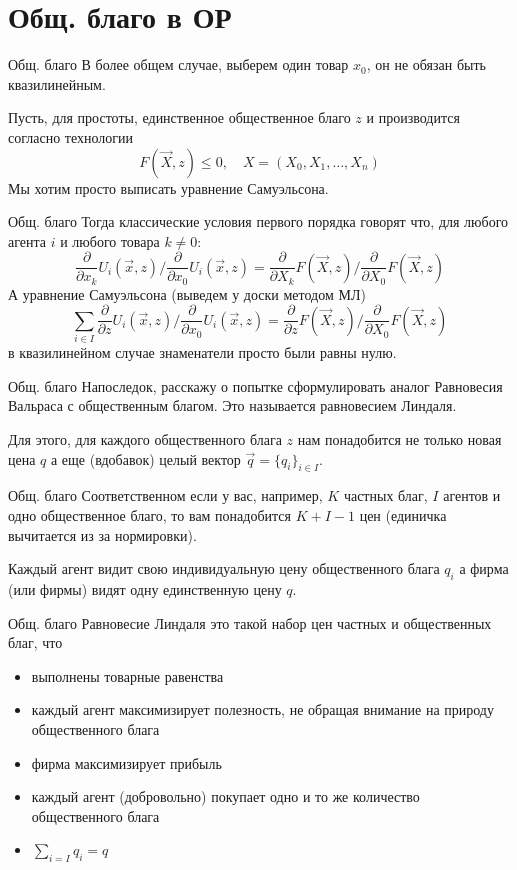 \documentclass{beamer}
\begin{document}
\section{Общ. благо в ОР}

\begin{frame}{Общ. благо}
В более общем случае, выберем один товар $x_0$, он не обязан быть квазилинейным. 

Пусть, для простоты, единственное общественное благо $z$ и производится согласно технологии
$$ F(\vec X, z) \leqslant 0, \quad X = (X_0,X_1, \ldots, X_n)$$
Мы хотим просто выписать уравнение Самуэльсона.
\end{frame}

\begin{frame}{Общ. благо}
Тогда классические условия первого порядка говорят что, для любого агента $i$ и любого товара $k \neq 0$:
$$ \frac{\partial}{\partial x_k} U_i(\vec x, z)/\frac{\partial}{\partial x_0} U_i(\vec x, z) = \frac{\partial}{\partial X_k} F(\vec X, z)/\frac{\partial}{\partial X_0} F(\vec X, z)$$
А \alert{уравнение Самуэльсона} (выведем у доски методом МЛ)
$$ \sum_{i \in I} \frac{\partial}{\partial z} U_i(\vec x, z)/\frac{\partial}{\partial x_0} U_i(\vec x, z) = \frac{\partial}{\partial z} F(\vec X, z)/\frac{\partial}{\partial X_0} F(\vec X, z)$$
в квазилинейном случае знаменатели просто были равны нулю.
\end{frame}

\begin{frame}{Общ. благо}
Напоследок, расскажу о попытке сформулировать аналог Равновесия Вальраса с общественным благом. Это называется \alert{равновесием Линдаля}.

Для этого, для каждого общественного блага $z$ нам понадобится не только новая цена $q$ а еще (вдобавок) целый вектор $\vec q = \{q_i\}_{i \in I}$.
\end{frame}

\begin{frame}{Общ. благо}
Соответственном если у вас, например, $K$ частных благ, $I$ агентов и одно общественное благо, то вам понадобится $K+I-1$ цен (единичка вычитается из за нормировки).

Каждый агент видит свою индивидуальную цену общественного блага $q_i$ а фирма (или фирмы) видят одну единственную цену $q$.
\end{frame}

\begin{frame}{Общ. благо}
\alert{Равновесие Линдаля} это такой набор цен частных и общественных благ, что 

\begin{itemize}
  \item выполнены товарные равенства
  \item каждый агент максимизирует полезность, не обращая внимание на природу общественного блага
  \item фирма максимизирует прибыль
  \item каждый агент (добровольно) покупает одно и то же количество общественного блага
  \item $\sum_{i=I} q_i = q$
\end{itemize}

\end{frame}
\end{document}
